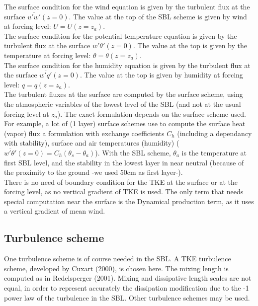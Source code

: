 The surface condition for the wind equation is given by the turbulent flux at the surface $\overline{u'w'}(z=0)$. The value at the top of the SBL scheme is given by wind at forcing level: $U=U(z=z_a)$. \\
The surface condition for the potential temperature equation is given by the turbulent flux at the surface $\overline{w'\theta'}(z=0)$. The value at the top is given by the temperature at forcing level: $\theta=\theta(z=z_a)$. \\
The surface condition for the humidity equation is given by the  turbulent flux at the surface $\overline{w'q'}(z=0)$. The value at the top is given by humidity at forcing level: $q=q(z=z_a)$. \\

The turbulent fluxes at the surface are computed by the surface scheme, using the atmospheric variables of the lowest level of the SBL (and not at the usual forcing level at $z_a$). The exact formulation depends on the surface scheme used. For example, a lot of (1 layer) surface schemes use to compute the surface heat (vapor)  flux a formulation with exchange coefficients $C_h$ (including a dependancy with stability), surface and air temperatures (humidity) ($\overline{w'\theta'}(z=0)=C_h (\theta_s - \theta_a)$). With the SBL scheme, $\theta_a$ is the temperature at first SBL level, and the stability in the lowest layer in near neutral (because of the proximity to the ground -we used 50cm as first layer-).\\

There is no need of boundary condition for the TKE at the surface or at the forcing level, as no vertical gradient of TKE is used. The only term that needs special computation near the surface is the Dynamical production term, as it uses a vertical gradient of mean wind. \\

\subsection{Turbulence scheme\label{turbs}}

One turbulence scheme is of course needed in the SBL. A TKE turbulence scheme, developed by Cuxart \etal (2000)\nocite{Cuxart2000}, is chosen here. The mixing length is computed as in Redelsperger \etal (2001)\nocite{Redelsperger2001}. Mixing and dissipative length scales are not equal, in order to represent accurately the dissipation modification due to the -1 power law of the turbulence in the SBL. Other turbulence schemes may be used.\\

